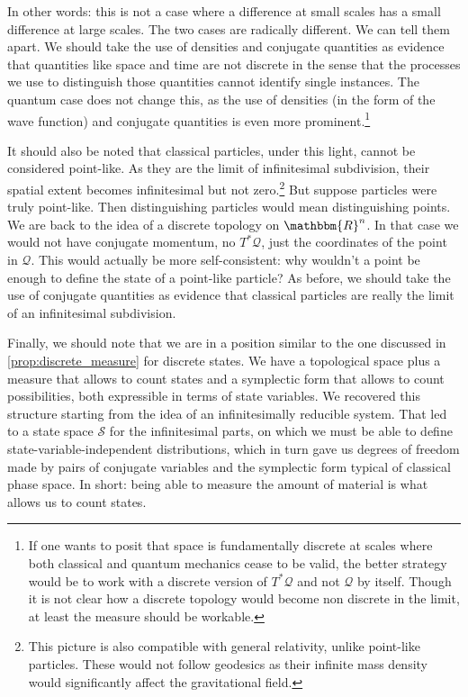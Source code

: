 \documentclass[aps,pra,10pt,twocolumn,floatfix,nofootinbib]{revtex4-1}
\numberwithin{equation}{section}
\theoremstyle{definition}
\begin{document}
In other words: this is not a case where a difference at  small scales has a small difference at large scales. The two cases are radically different. We can tell them apart. We should take the use of densities and conjugate quantities as evidence that quantities like space and time are not discrete in the sense that the processes we use to distinguish those quantities cannot identify single instances. The quantum case does not change this, as the use of densities (in the form of the wave function) and conjugate quantities is even more prominent.\footnote{If one wants to posit that space is fundamentally discrete at scales where both classical and quantum mechanics cease to be valid, the better strategy would be to work with a discrete version of $T^*\mathcal{Q}$ and not $\mathcal{Q}$ by itself. Though it is not clear how a discrete topology would become non discrete in the limit, at least the measure should be workable.}

It should also be noted that classical particles, under this light, cannot be considered point-like. As they are the limit of infinitesimal subdivision, their spatial extent becomes infinitesimal but not zero.\footnote{This picture is also compatible with general relativity, unlike point-like particles. These would not follow geodesics as their infinite mass density would significantly affect the gravitational field.} But suppose particles were truly point-like. Then distinguishing particles would mean distinguishing points. We are back to the idea of a discrete topology on $\mathbbm{R}^n$. In that case we would not have conjugate momentum, no $T^*\mathcal{Q}$, just the coordinates of the point in $\mathcal{Q}$. This would actually be more self-consistent: why wouldn't a point be enough to define the state of a point-like particle? As before, we should take the use of conjugate quantities as evidence that classical particles are really the limit of an infinitesimal subdivision.

Finally, we should note that we are in a position similar to the one discussed in \ref{prop:discrete_measure} for discrete states. We have a topological space plus a measure that allows to count states and a symplectic form that allows to count possibilities, both expressible in terms of state variables. We recovered this structure starting from the idea of an infinitesimally reducible system. That led to a state space $\mathcal{S}$ for the infinitesimal parts, on which we must be able to define state-variable-independent distributions, which in turn gave us degrees of freedom made by pairs of conjugate variables and the symplectic form typical of classical phase space. In short: being able to measure the amount of material is what allows us to count states.
\end{document}
